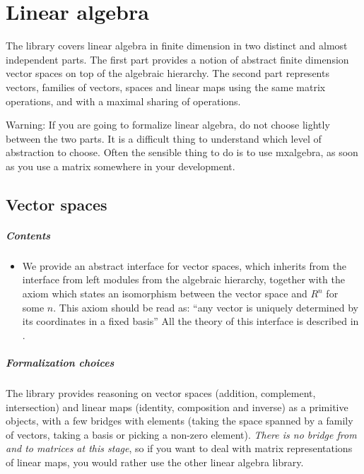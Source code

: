 \chapter{Linear algebra}
\label{linalg:smith}

The library covers linear algebra in finite dimension in two distinct
and almost independent parts. The first part provides a notion of
abstract finite dimension vector spaces on top of the algebraic
hierarchy. The second part represents vectors, families of vectors,
spaces and linear maps using the same matrix operations, and with a
maximal sharing of operations.

Warning: If you are going to formalize linear algebra, do not choose
lightly between the two parts. It is a difficult thing to understand
which level of abstraction to choose. Often the sensible thing to do
is to use mxalgebra, as soon as you use a matrix somewhere in your
development.

\section{Vector spaces}
\label{sec:vector-spaces}

\paragraph{Contents}

\begin{itemize}
\item We provide an abstract interface for vector spaces, which
  inherits from the interface from left modules from the algebraic
  hierarchy, together with the axiom  which states
  an isomorphism between the vector space and $R^n$ for some $n$. This
  axiom should be read as: ``any vector is uniquely determined by its
  coordinates in a fixed basis'' All the theory of this interface is
  described in .
\end{itemize}

\paragraph{Formalization choices}

The library provides reasoning on vector spaces (addition, complement,
intersection) and linear maps (identity, composition and inverse) as a
primitive objects, with a few bridges with elements (taking the space
spanned by a family of vectors, taking a basis or picking a non-zero
element). \emph{There is no bridge from and to matrices at this
  stage}, so if you want to deal with matrix representations of linear
maps, you would rather use the other linear algebra library.

